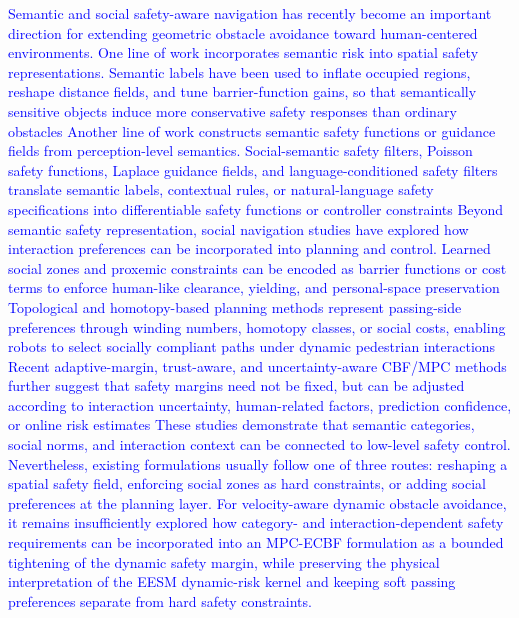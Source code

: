 \documentclass[journal]{IEEEtranTIE}
\begin{document}
\textcolor{blue}{Semantic and social safety-aware navigation has recently become an important direction for extending geometric obstacle avoidance toward human-centered environments. One line of work incorporates semantic risk into spatial safety representations. Semantic labels have been used to inflate occupied regions, reshape distance fields, and tune barrier-function gains, so that semantically sensitive objects induce more conservative safety responses than ordinary obstacles%
Another line of work constructs semantic safety functions or guidance fields from perception-level semantics. Social-semantic safety filters, Poisson safety functions, Laplace guidance fields, and language-conditioned safety filters translate semantic labels, contextual rules, or natural-language safety specifications into differentiable safety functions or controller constraints%
Beyond semantic safety representation, social navigation studies have explored how interaction preferences can be incorporated into planning and control. Learned social zones and proxemic constraints can be encoded as barrier functions or cost terms to enforce human-like clearance, yielding, and personal-space preservation%
Topological and homotopy-based planning methods represent passing-side preferences through winding numbers, homotopy classes, or social costs, enabling robots to select socially compliant paths under dynamic pedestrian interactions%
Recent adaptive-margin, trust-aware, and uncertainty-aware CBF/MPC methods further suggest that safety margins need not be fixed, but can be adjusted according to interaction uncertainty, human-related factors, prediction confidence, or online risk estimates%
These studies demonstrate that semantic categories, social norms, and interaction context can be connected to low-level safety control. Nevertheless, existing formulations usually follow one of three routes: reshaping a spatial safety field, enforcing social zones as hard constraints, or adding social preferences at the planning layer. For velocity-aware dynamic obstacle avoidance, it remains insufficiently explored how category- and interaction-dependent safety requirements can be incorporated into an MPC-ECBF formulation as a bounded tightening of the dynamic safety margin, while preserving the physical interpretation of the EESM dynamic-risk kernel and keeping soft passing preferences separate from hard safety constraints.}
\end{document}
